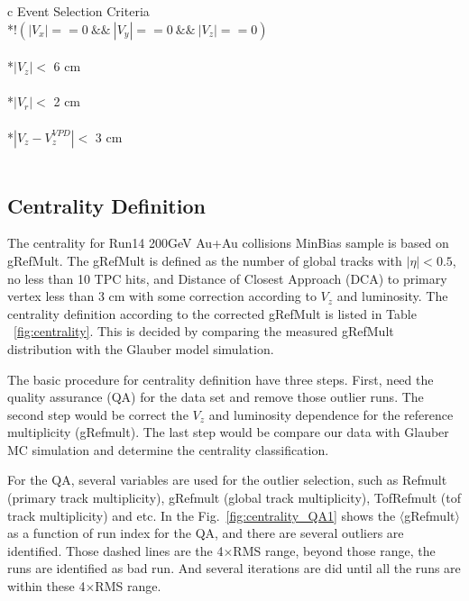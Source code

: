\begin{table}[htp]
\centering
\caption{Event selection in Au+Au collisions at 200 GeV for $D^0$.}
\label{eventselection}
\begin{tabular}{c}
\toprule[1.6pt]
Event Selection Criteria \\
\midrule[1.2pt]
*{$!(|V_{x}|== 0 \ \&\& \ |V_{y}|== 0 \  \&\& \  |V_{z}|== 0) $ } \\
\\
*{$|V_{z}|<$ 6 cm} \\
\\
*{$|V_{r}|<$ 2 cm} \\
\\
*{$|V_{z} - V_{z}^{VPD}|<$ 3 cm} \\ 
\\  
\bottomrule[1.6pt]
\end{tabular}
\end{table}

\subsection{Centrality Definition}

The centrality for Run14 200GeV Au+Au collisions MinBias sample is based on gRefMult. The gRefMult is defined as the number of global tracks with $|\eta|<0.5$, no less than 10 TPC hits, and Distance of Closest Approach (DCA) to primary vertex less than 3 cm with some correction according to $V_{z}$ and luminosity. The centrality definition according to the corrected gRefMult is listed in Table ~\ref{fig:centrality}. This is decided by comparing the measured gRefMult distribution with the Glauber model simulation. 

The basic procedure for centrality definition have three steps. First, need the quality assurance (QA) for the data set and remove those outlier runs. The second step would be correct the $V_{z}$ and luminosity dependence for the reference multiplicity (gRefmult). The last step would be compare our data with Glauber MC simulation and determine the centrality classification.

For the QA, several variables are used for the outlier selection, such as Refmult (primary track multiplicity), gRefmult (global track multiplicity), TofRefmult (tof track multiplicity) and etc. In the Fig.~\ref{fig:centrality_QA1} shows the $\langle$gRefmult$\rangle$ as a function of run index for the QA, and there are several outliers are identified. Those dashed lines are the 4$\times$RMS range, beyond those range, the runs are identified as bad run. And several iterations are did until all the runs are within these 4$\times$RMS range.


